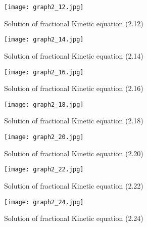\documentclass{article}
\begin{document}
\begin{figure}[H]
    \centering
    \texttt{[image: graph2\_12.jpg]}
    \caption{Solution of fractional Kinetic equation (2.12)}
\end{figure}
\begin{figure}[H]
    \centering
    \texttt{[image: graph2\_14.jpg]}
    \caption{Solution of fractional Kinetic equation (2.14)}
\end{figure}
\begin{figure}[H]
    \centering
    \texttt{[image: graph2\_16.jpg]}
    \caption{Solution of fractional Kinetic equation (2.16)}
\end{figure}
\begin{figure}[H]
    \centering
    \texttt{[image: graph2\_18.jpg]}
    \caption{Solution of fractional Kinetic equation (2.18)}
\end{figure}
\begin{figure}[H]
    \centering
    \texttt{[image: graph2\_20.jpg]}
    \caption{Solution of fractional Kinetic equation (2.20)}
\end{figure}
\begin{figure}[H]
    \centering
    \texttt{[image: graph2\_22.jpg]}
    \caption{Solution of fractional Kinetic equation (2.22)}
\end{figure}
\begin{figure}[H]
    \centering
    \texttt{[image: graph2\_24.jpg]}
    \caption{Solution of fractional Kinetic equation (2.24)}
\end{figure}
\end{document}
